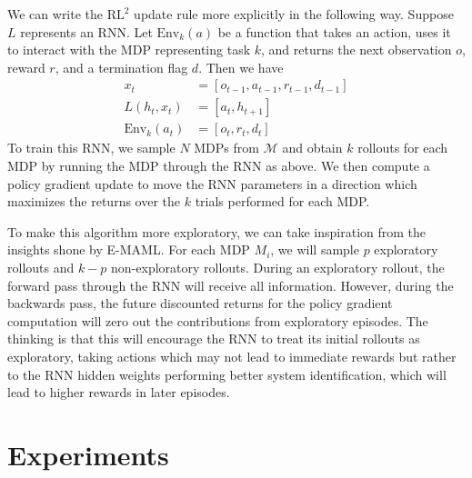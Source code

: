 \documentclass{article} %
\begin{document}
We can write the $\text{RL}^2$ update rule more explicitly in the following way. Suppose $L$ represents an RNN. Let $\text{Env}_k(a)$ be a function that takes an action, uses it to interact with the MDP representing task $k$, and returns the next observation $o$, reward $r$, and a termination flag $d$. Then we have 
\begin{align*}
    x_t &= \left[o_{t-1}, a_{t-1}, r_{t-1}, d_{t-1} \right] \\
    L(h_t, x_t) &= \left[ a_t, h_{t+1}\right] \\
    \text{Env}_k(a_t) &= \left[ o_t, r_t, d_t \right]
\end{align*}
To train this RNN, we sample $N$ MDPs from $\mathcal{M}$ and obtain $k$ rollouts for each MDP by running the MDP through the RNN as above. We then compute a policy gradient update to move the RNN parameters in a direction which maximizes the returns over the $k$ trials performed for each MDP. 

To make this algorithm more exploratory, we can take inspiration from the insights shone by E-MAML. For each MDP $M_i$, we will sample $p$ exploratory rollouts and $k-p$ non-exploratory rollouts. During an exploratory rollout, the forward pass through the RNN will receive all information. However, during the backwards pass, the future discounted returns for the policy gradient computation will zero out the contributions from exploratory episodes. The thinking is that this will encourage the RNN to treat its initial rollouts as exploratory, taking actions which may not lead to immediate rewards but rather to the RNN hidden weights performing better system identification, which will lead to higher rewards in later episodes.     


\section{Experiments}
\end{document}
